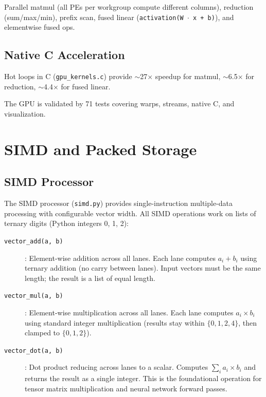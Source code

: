 \documentclass[10pt,a4paper,twoside]{book}
\begin{document}
Parallel matmul (all PEs per workgroup compute different columns), reduction
(sum/max/min), prefix scan, fused linear (\texttt{activation(W $\cdot$ x + b)}),
and elementwise fused ops.

\section{Native C Acceleration}

Hot loops in C (\texttt{gpu\_kernels.c}) provide $\sim$27$\times$ speedup for matmul,
$\sim$6.5$\times$ for reduction, $\sim$4.4$\times$ for fused linear.

The GPU is validated by 71 tests covering warps, streams, native C, and visualization.

\chapter{SIMD and Packed Storage}
\label{ch:simd}

\section{SIMD Processor}

The SIMD processor (\texttt{simd.py}) provides single-instruction multiple-data
processing with configurable vector width. All SIMD operations work on lists of
ternary digits (Python integers 0, 1, 2):

\begin{description}
    \item[\texttt{vector\_add(a, b)}]: Element-wise addition across all lanes.
          Each lane computes $a_i + b_i$ using ternary addition (no carry between
          lanes). Input vectors must be the same length; the result is a list of
          equal length.
    \item[\texttt{vector\_mul(a, b)}]: Element-wise multiplication across all lanes.
          Each lane computes $a_i \times b_i$ using standard integer multiplication
          (results stay within $\{0,1,2,4\}$, then clamped to $\{0,1,2\}$).
    \item[\texttt{vector\_dot(a, b)}]: Dot product reducing across lanes to a scalar.
          Computes $\sum_i a_i \times b_i$ and returns the result as a single integer.
          This is the foundational operation for tensor matrix multiplication and
          neural network forward passes.
\end{description}
\end{document}
